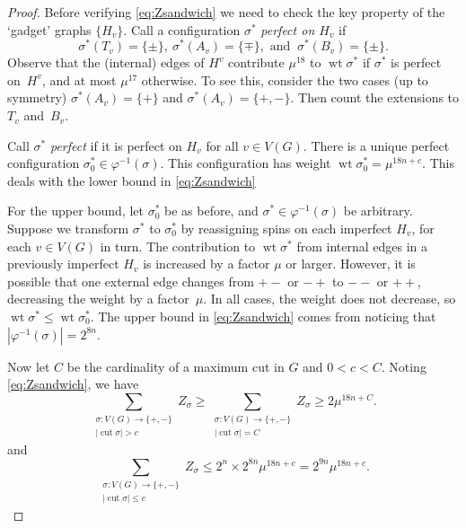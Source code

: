 \documentclass[11pt]{amsart}
\newcommand{\wt}{\mathop{\mathrm{wt}}}
\newcommand{\cut}{\mathop{\mathrm{cut}}}
\let\phi=\varphi
\begin{document}
\begin{proof}
Before verifying \eqref{eq:Zsandwich} we need to check the key property of the `gadget' graphs $\{H_v\}$.  Call a configuration $\sigma^*$ \emph{perfect on $H_v$} if 
$$
\sigma^*(T_v)=\{\pm\}, \>
\sigma^*(A_v)=\{\mp\}, \text{\ and\ }\> \sigma^*(B_v)=\{\pm\}.
$$
Observe that the (internal) edges of $H^v$ contribute $\mu^{18}$ to $\wt\sigma^*$ if $\sigma^*$ is perfect on~$H^v$, and at most $\mu^{17}$ otherwise.  To see this, consider the two cases (up to symmetry) $\sigma^*(A_v)=\{+\}$ and $\sigma^*(A_v)=\{+,-\}$.  Then count the extensions to $T_v$ and~$B_v$.

Call  $\sigma^*$ \emph{perfect} if it is perfect on $H_v$ for all $v\in V(G)$.  There is a unique perfect configuration $\sigma_0^*\in \phi^{-1}(\sigma)$.  This configuration has weight $\wt\sigma_0^*=\mu^{18n+c}$.  This deals with the lower bound in \eqref{eq:Zsandwich}

For the upper bound, let $\sigma^*_0$ be as before, and $\sigma^*\in\phi^{-1}(\sigma)$ be arbitrary.  Suppose we transform $\sigma^*$ to $\sigma^*_0$ by reassigning spins on each imperfect $H_v$, for each $v\in V(G)$ in turn.   The contribution to $\wt\sigma^*$ from internal edges in a previously imperfect $H_v$ is increased by a factor $\mu$ or larger.  However, it is possible that one external edge changes from $+-$ or $-+$ to $--$ or $++$, decreasing the weight by a factor~$\mu$.  In all cases, the weight does not decrease, so $\wt \sigma^*\leq\wt \sigma^*_0$.   The upper bound in \eqref{eq:Zsandwich} comes from noticing that $|\phi^{-1}(\sigma)|=2^{8n}$.

Now let $C$ be the cardinality of a maximum cut in $G$ and $0<c<C$.  Noting \eqref{eq:Zsandwich}, we have
\begin{equation}\label{eq:lbZ}
\sum_{\substack{\sigma:V(G)\to\{+,-\}\\ |\cut\sigma|>c}} Z_\sigma \geq 
\sum_{\substack{\sigma:V(G)\to\{+,-\}  \\ |\cut\sigma|=C}} Z_\sigma \geq 2\mu^{18n+C}.
\end{equation}
and 
\begin{equation}\label{eq:ubZ}
\sum_{\substack{\sigma:V(G)\to\{+,-\} \\ |\cut\sigma|\leq c}} Z_\sigma \leq 2^n\times  2^{8n}\mu^{18n+c}=2^{9n}\mu^{18n+c}.
\end{equation}


\end{proof}
\end{document}
